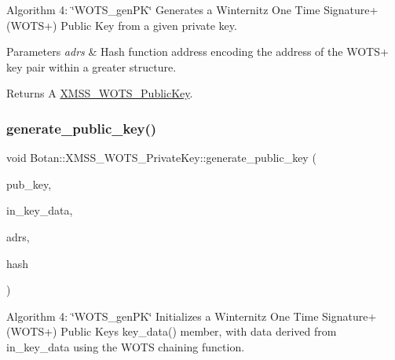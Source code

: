 Algorithm 4\+: \char`\"{}\+W\+O\+T\+S\+\_\+gen\+P\+K\char`\"{} Generates a Winternitz One Time Signature+ (W\+O\+T\+S+) Public Key from a given private key.


\begin{DoxyParams}{Parameters}
{\em adrs} & Hash function address encoding the address of the W\+O\+T\+S+ key pair within a greater structure.\\
\hline
\end{DoxyParams}
\begin{DoxyReturn}{Returns}
A \hyperlink{class_botan_1_1_x_m_s_s___w_o_t_s___public_key}{X\+M\+S\+S\+\_\+\+W\+O\+T\+S\+\_\+\+Public\+Key}. 
\end{DoxyReturn}
\mbox{\label{class_botan_1_1_x_m_s_s___w_o_t_s___private_key_a0d0695d108fd991536679070d88e4ea1}} 
\subsubsection{\texorpdfstring{generate\+\_\+public\+\_\+key()}{generate\_public\_key()}\hspace{0.1cm}{\footnotesize\ttfamily [2/3]}}
{\footnotesize\ttfamily void Botan\+::\+X\+M\+S\+S\+\_\+\+W\+O\+T\+S\+\_\+\+Private\+Key\+::generate\+\_\+public\+\_\+key (\begin{DoxyParamCaption}\item[{\hyperlink{class_botan_1_1_x_m_s_s___w_o_t_s___public_key}{X\+M\+S\+S\+\_\+\+W\+O\+T\+S\+\_\+\+Public\+Key} \&}]{pub\+\_\+key,  }\item[{wots\+\_\+keysig\+\_\+t \&\&}]{in\+\_\+key\+\_\+data,  }\item[{\hyperlink{class_botan_1_1_x_m_s_s___address}{X\+M\+S\+S\+\_\+\+Address} \&}]{adrs,  }\item[{\hyperlink{class_botan_1_1_x_m_s_s___hash}{X\+M\+S\+S\+\_\+\+Hash} \&}]{hash }\end{DoxyParamCaption})}

Algorithm 4\+: \char`\"{}\+W\+O\+T\+S\+\_\+gen\+P\+K\char`\"{} Initializes a Winternitz One Time Signature+ (W\+O\+T\+S+) Public Key\textquotesingle{}s key\+\_\+data() member, with data derived from in\+\_\+key\+\_\+data using the W\+O\+TS chaining function.

